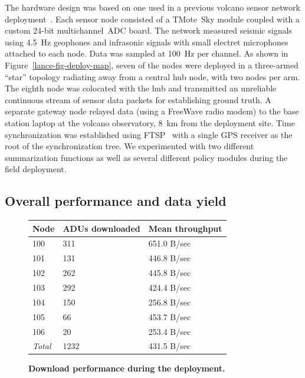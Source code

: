 The hardware design was based on one used in a previous volcano sensor
network deployment~\cite{volcano-osdi06}.
Each sensor node consisted of a TMote~Sky module
coupled with a custom 24-bit multichannel~ADC board. The network measured
seismic signals using 4.5~Hz geophones and infrasonic signals with small
electret microphones attached to each node.  Data was sampled at 100~Hz
per channel. As shown in Figure~\ref{lance-fig-deploy-map}, seven of the nodes 
were deployed in a three-armed ``star'' topology radiating away from 
a central hub node, with two nodes per arm. 
The eighth node was colocated with the hub and 
transmitted an unreliable continuous stream of sensor data packets 
for establishing ground truth. 
A separate gateway node relayed data (using a FreeWave radio modem) 
to the base station laptop at the volcano observatory, 8~km
from the deployment site. Time synchronization was established using
FTSP~\cite{ftsp} with a single GPS receiver as the root of the
synchronization tree. 
We experimented with two different summarization functions as well as
several different policy modules during the field deployment.

\subsection{Overall performance and data yield}



\begin{figure}[t]
\label{lance-fig-deploy-throughput}
\begin{center}
\begin{tabular}{|l|l|l|} \hline 
{\bf Node}	& {\bf ADUs downloaded} & {\bf Mean throughput} \\ \hline
100 & 311 & 651.0 B/sec \\
101 & 131 & 446.8 B/sec \\
102 & 262 & 445.8 B/sec \\
103 & 292 & 424.4 B/sec \\
104 & 150 & 256.8 B/sec \\
105 & 66 & 453.7 B/sec \\
106 & 20 & 253.4 B/sec \\ \hline
{\em Total} & 1232 & 431.5 B/sec \\ \hline
\end{tabular}
\end{center}
\caption{\textbf{Download performance during the deployment.}}
\end{figure}

